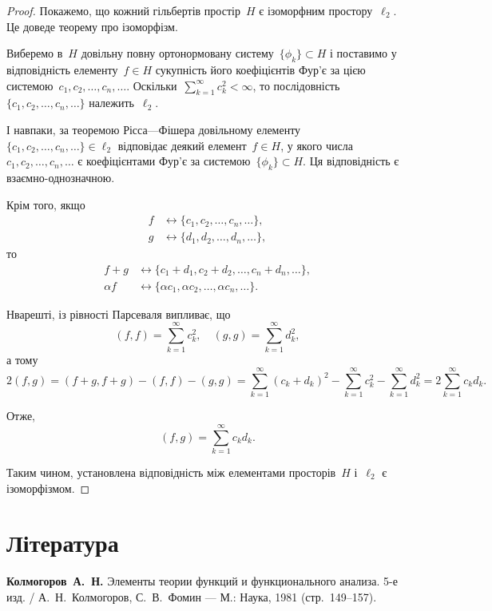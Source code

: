 \begin{proof}
    Покажемо, що кожний гільбертів простір~$H$ є ізоморфним простору~$\ell_2$. Це доведе теорему про ізоморфізм.
    
    Виберемо в~$H$ довільну повну ортонормовану систему~$\{\phi_k\} \subset H$ і поставимо у відповідність елементу~$f \in H$ сукупність його коефіцієнтів Фур'є за цією системою~$c_1, c_2, \dots, c_n, \dots$. Оскільки~$\sum_{k = 1}^\infty c_k^2 < \infty$, то послідовність~$\{c_1, c_2, \dots, c_n, \dots\}$ належить~$\ell_2$.
    
    І навпаки, за теоремою Рісса---Фішера довільному елементу~$\{c_1, c_2, \dots, c_n, \dots\} \in \ell_2$ відповідає деякий елемент~$f \in H$, у якого числа~$c_1, c_2, \dots, c_n, \dots$ є коефіцієнтами Фур'є за системою~$\{\phi_k\} \subset H$. Ця відповідність є взаємно-однозначною.
    
    Крім того, якщо
    \begin{align*}
        f &\leftrightarrow \{c_1, c_2, \dots, c_n, \dots\}, \\
        g &\leftrightarrow \{d_1, d_2, \dots, d_n, \dots\},
    \end{align*}
    то
    \begin{align*}
        f + g &\leftrightarrow \{c_ 1 + d_1, c_2 + d_2, \dots, c_n + d_n, \dots\}, \\
        \alpha f &\leftrightarrow \{\alpha c_1, \alpha c_2, \dots, \alpha c_n, \dots\}.
    \end{align*}
    
    Нварешті, із рівності Парсеваля випливає, що
    \begin{equation*}
        (f, f) = \sum_{k = 1}^\infty c_k^2, \quad
        (g, g) = \sum_{k = 1}^\infty d_k^2,
    \end{equation*}
    а тому
    \begin{equation*}
        2 (f, g) = (f + g, f + g) - (f, f) - (g, g) =
        \sum_{k = 1}^\infty (c_k + d_k)^2 -
        \sum_{k = 1}^\infty c_k^2 -
        \sum_{k = 1}^\infty d_k^2 =
        2 \sum_{k = 1}^\infty c_k d_k.
    \end{equation*}
    
    Отже,
    \begin{equation*}
        (f, g) = \sum_{k = 1}^\infty c_k d_k.
    \end{equation*}
    
    Таким чином, установлена відповідність між елементами просторів~$H$ і~$\ell_2$ є ізоморфізмом. 
\end{proof}

\section{Література}

\begin{enumerate}[label={[\arabic*]}]
\item \textbf{Колмогоров~А.~Н.}
Элементы теории функций и функционального анализа. 5-е изд. /
А.~Н.~Колмогоров, С.~В.~Фомин ---
М.: Наука, 1981 (стр.~149--157).
\end{enumerate}
